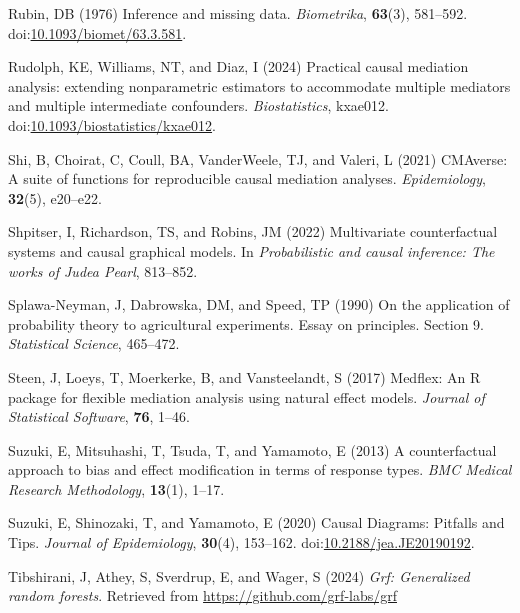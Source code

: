 \documentclass[
  single column]{article}
\newlength{\cslhangindent}
\newenvironment{CSLReferences}[2] %
 {\begin{list}{}{%
  \setlength{\itemindent}{0pt}
  \setlength{\leftmargin}{0pt}
  \setlength{\parsep}{0pt}
  \ifodd #1
   \setlength{\leftmargin}{\cslhangindent}
   \setlength{\itemindent}{-1\cslhangindent}
  \fi
  \setlength{\itemsep}{#2\baselineskip}}}
 {\end{list}}
\begin{document}
\begin{CSLReferences}{1}{0}
Rubin, DB (1976) Inference and missing data. \emph{Biometrika},
\textbf{63}(3), 581--592.
doi:\href{https://doi.org/10.1093/biomet/63.3.581}{10.1093/biomet/63.3.581}.

Rudolph, KE, Williams, NT, and Diaz, I (2024) {Practical causal
mediation analysis: extending nonparametric estimators to accommodate
multiple mediators and multiple intermediate confounders}.
\emph{Biostatistics}, kxae012.
doi:\href{https://doi.org/10.1093/biostatistics/kxae012}{10.1093/biostatistics/kxae012}.

Shi, B, Choirat, C, Coull, BA, VanderWeele, TJ, and Valeri, L (2021)
CMAverse: A suite of functions for reproducible causal mediation
analyses. \emph{Epidemiology}, \textbf{32}(5), e20--e22.

Shpitser, I, Richardson, TS, and Robins, JM (2022) Multivariate
counterfactual systems and causal graphical models. In
\emph{Probabilistic and causal inference: The works of {J}udea {P}earl},
813--852.

Splawa-Neyman, J, Dabrowska, DM, and Speed, TP (1990) On the application
of probability theory to agricultural experiments. Essay on principles.
Section 9. \emph{Statistical Science}, 465--472.

Steen, J, Loeys, T, Moerkerke, B, and Vansteelandt, S (2017) Medflex: An
{R} package for flexible mediation analysis using natural effect models.
\emph{Journal of Statistical Software}, \textbf{76}, 1--46.

Suzuki, E, Mitsuhashi, T, Tsuda, T, and Yamamoto, E (2013) A
counterfactual approach to bias and effect modification in terms of
response types. \emph{BMC Medical Research Methodology}, \textbf{13}(1),
1--17.

Suzuki, E, Shinozaki, T, and Yamamoto, E (2020) Causal Diagrams:
Pitfalls and Tips. \emph{Journal of Epidemiology}, \textbf{30}(4),
153--162.
doi:\href{https://doi.org/10.2188/jea.JE20190192}{10.2188/jea.JE20190192}.

Tibshirani, J, Athey, S, Sverdrup, E, and Wager, S (2024) \emph{Grf:
Generalized random forests}. Retrieved from
\url{https://github.com/grf-labs/grf}


\end{CSLReferences}
\end{document}
